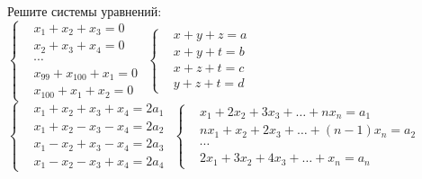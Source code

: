 \begin{problems}
\item
Решите системы уравнений:
\\[1ex]
\sbp
\(\left\{\begin{aligned}
&   x_1 + x_2 + x_3 = 0
\\
&   x_2 + x_3 + x_4 = 0
\\[-0.5ex]
&   \cdots
\\[-0.5ex]
&   x_{99} + x_{100} + x_1 = 0
\\
&   x_{100} + x_1 + x_2 = 0
\end{aligned}\right.\)
\qquad
\sbp
\(\left\{\begin{aligned}
&   x + y + z = a
\\
&   x + y + t = b
\\
&   x + z + t = c
\\
&   y + z + t = d
\end{aligned}\right.\)
\\[1ex]
\sbp
\(\left\{\begin{aligned}
&   x_1 + x_2 + x_3 + x_4 = 2 a_1
\\
&   x_1 + x_2 - x_3 - x_4 = 2 a_2
\\
&   x_1 - x_2 + x_3 - x_4 = 2 a_3
\\
&   x_1 - x_2 - x_3 + x_4 = 2 a_4
\end{aligned}\right.\)
\qquad
\sbp
\(\left\{\begin{aligned}
&   x_1 + 2 x_2 + 3 x_3 + \ldots + n x_n = a_1
\\
&   n x_1 + x_2 + 2 x_3 + \ldots + (n - 1) x_n = a_2
\\[-0.5ex]
&   \cdots
\\[-0.5ex]
&   2 x_1 + 3 x_2 + 4 x_3 + \ldots + x_n = a_n
\end{aligned}\right.\)

\end{problems}

